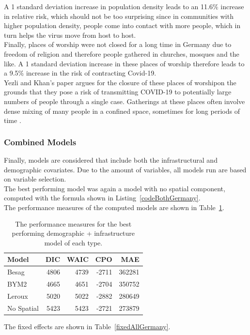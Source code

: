 A 1 standard deviation increase in population density leads to an 11.6\% increase in relative risk, which should not be too surprising since in communities with higher population density, people come into contact with more people, which in turn helps the virus move from host to host. \\
Finally, places of worship were not closed for a long time in Germany due to freedom of religion and therefore people gathered in churches, mosques and the like. A 1 standard deviation increase in these places of worship therefore leads to a 9.5\% increase in the risk of contracting Covid-19. \\
Yezli and Khan's paper argues for the closure of these places of worshipon the grounds that they pose a risk of transmitting COVID-19 to potentially large numbers of people through a single case. Gatherings at these places often involve dense mixing of many people in a confined space, sometimes for long periods of time \cite{yezli2020covid}.
\subsubsection{Combined Models}
Finally, models are considered that include both the infrastructural and demographic covariates. Due to the amount of variables, all models run are based on variable selection. \\
The best performing model was again a model with no spatial component, computed with the formula shown in Listing~\ref{codeBothGermany}. \\
The performance measures of the computed models are shown in Table~\ref{allGermany}.
\begin{table}[H] 
\caption{The performance measures for the best performing demographic + infrastructure model of each type. \label{allGermany}}
\begin{tabular}{l r r r r}
\toprule
\textbf{Model}	& \textbf{DIC}	& \textbf{WAIC} & \textbf{CPO} & \textbf{MAE}\\
\midrule
Besag&  4806 & 4739 & -2711 & 362281\\
BYM2 & 4665 & 4651 & -2704 & 350752\\
Leroux & 5020 & 5022 & -2882 & 280649 \\
No Spatial & 5423 & 5423 & -2721 & 273879 \\
\bottomrule
\end{tabular}
\end{table}
The fixed effects are shown in Table~\ref{fixedAllGermany}.

